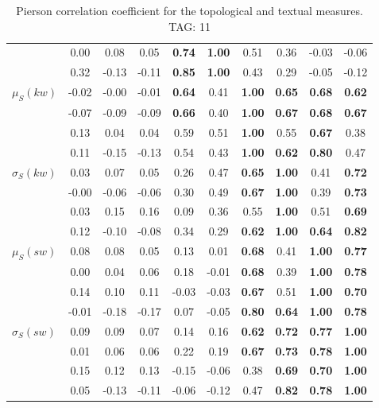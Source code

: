 \begin{table*}[h!]
\begin{center}
\begin{tabular}{| l || c | c | c | c | c | c | c | c | c |}
 & 0.00 & 0.08 & 0.05 & {\bf 0.74} & {\bf 1.00} & 0.51 & 0.36 & -0.03 & -0.06 \\
 & 0.32 & -0.13 & -0.11 & {\bf 0.85} & {\bf 1.00} & 0.43 & 0.29 & -0.05 & -0.12 \\\hline
$\mu_S(kw)$ & -0.02 & -0.00 & -0.01 & {\bf 0.64} & 0.41 & {\bf 1.00} & {\bf 0.65} & {\bf 0.68} & {\bf 0.62} \\
 & -0.07 & -0.09 & -0.09 & {\bf 0.66} & 0.40 & {\bf 1.00} & {\bf 0.67} & {\bf 0.68} & {\bf 0.67} \\
 & 0.13 & 0.04 & 0.04 & 0.59 & 0.51 & {\bf 1.00} & 0.55 & {\bf 0.67} & 0.38 \\
 & 0.11 & -0.15 & -0.13 & 0.54 & 0.43 & {\bf 1.00} & {\bf 0.62} & {\bf 0.80} & 0.47 \\\hline
$\sigma_S(kw)$ & 0.03 & 0.07 & 0.05 & 0.26 & 0.47 & {\bf 0.65} & {\bf 1.00} & 0.41 & {\bf 0.72} \\
 & -0.00 & -0.06 & -0.06 & 0.30 & 0.49 & {\bf 0.67} & {\bf 1.00} & 0.39 & {\bf 0.73} \\
 & 0.03 & 0.15 & 0.16 & 0.09 & 0.36 & 0.55 & {\bf 1.00} & 0.51 & {\bf 0.69} \\
 & 0.12 & -0.10 & -0.08 & 0.34 & 0.29 & {\bf 0.62} & {\bf 1.00} & {\bf 0.64} & {\bf 0.82} \\\hline
$\mu_S(sw)$ & 0.08 & 0.08 & 0.05 & 0.13 & 0.01 & {\bf 0.68} & 0.41 & {\bf 1.00} & {\bf 0.77} \\
 & 0.00 & 0.04 & 0.06 & 0.18 & -0.01 & {\bf 0.68} & 0.39 & {\bf 1.00} & {\bf 0.78} \\
 & 0.14 & 0.10 & 0.11 & -0.03 & -0.03 & {\bf 0.67} & 0.51 & {\bf 1.00} & {\bf 0.70} \\
 & -0.01 & -0.18 & -0.17 & 0.07 & -0.05 & {\bf 0.80} & {\bf 0.64} & {\bf 1.00} & {\bf 0.78} \\\hline
$\sigma_S(sw)$ & 0.09 & 0.09 & 0.07 & 0.14 & 0.16 & {\bf 0.62} & {\bf 0.72} & {\bf 0.77} & {\bf 1.00} \\
 & 0.01 & 0.06 & 0.06 & 0.22 & 0.19 & {\bf 0.67} & {\bf 0.73} & {\bf 0.78} & {\bf 1.00} \\
 & 0.15 & 0.12 & 0.13 & -0.15 & -0.06 & 0.38 & {\bf 0.69} & {\bf 0.70} & {\bf 1.00} \\
 & 0.05 & -0.13 & -0.11 & -0.06 & -0.12 & 0.47 & {\bf 0.82} & {\bf 0.78} & {\bf 1.00} \\\hline
\end{tabular}
\caption{Pierson correlation coefficient for the topological and textual measures. TAG: 11}
\end{center}
\end{table*}